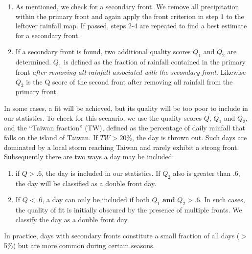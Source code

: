 \documentclass[draft,grl]{AGUTeX}
\begin{document}
\begin{article}
\begin{enumerate}
	\item As mentioned, we check for a secondary front. We remove all precipitation within the primary front and again apply the front criterion in step 1 to the leftover rainfall map. If passed, steps 2-4 are repeated to find a best estimate for a secondary front.
	
	\item If a secondary front is found, two additional quality scores $Q_1$ and $Q_2$ are determined. $Q_1$ is defined as the fraction of rainfall contained in the primary front \textit{after removing all rainfall associated with the secondary front}. Likewise $Q_2$ is the Q score of the second front after removing all rainfall from the primary front.
			
\end{enumerate} 
	
In some cases, a fit will be achieved, but its quality will be too poor to include in our statistics. To check for this scenario, we use the quality scores $Q$, $Q_1$ and $Q_2$, and the ``Taiwan fraction'' (TW), defined as the percentage of daily rainfall that falls on the island of Taiwan. If $TW > 20\%$, the day is thrown out. Such days are dominated by a local storm reaching Taiwan and rarely exhibit a strong front. Subsequently there are two ways a day may be included: 
	
\begin{enumerate}
	\item if $Q>.6$, the day is included in our statistics. If $Q_2$ also is greater than .6, the day will be classified as a double front day.
		
	\item If $Q<.6$, a day can only be included if both $Q_1 \mathrm{\textbf{ and }} Q_2 > .6$. In such cases, the quality of fit is initially obscured by the presence of multiple fronts. We classify the day as a double front day.
\end{enumerate}	
		
	In practice, days with secondary fronts constitute a small fraction of all days ($>$ 5\%) but are more common during certain seasons.
		

\end{article}
\end{document}
